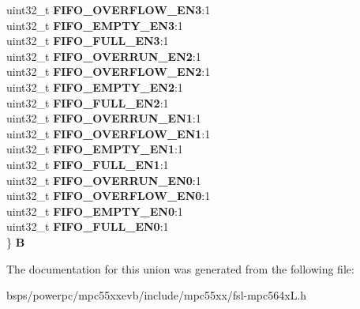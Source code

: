 \begin{DoxyCompactItemize}
\begin{tabbing}
\>uint32\_t {\bfseries FIFO\_OVERFLOW\_EN3}:1\\
\>uint32\_t {\bfseries FIFO\_EMPTY\_EN3}:1\\
\>uint32\_t {\bfseries FIFO\_FULL\_EN3}:1\\
\>uint32\_t {\bfseries FIFO\_OVERRUN\_EN2}:1\\
\>uint32\_t {\bfseries FIFO\_OVERFLOW\_EN2}:1\\
\>uint32\_t {\bfseries FIFO\_EMPTY\_EN2}:1\\
\>uint32\_t {\bfseries FIFO\_FULL\_EN2}:1\\
\>uint32\_t {\bfseries FIFO\_OVERRUN\_EN1}:1\\
\>uint32\_t {\bfseries FIFO\_OVERFLOW\_EN1}:1\\
\>uint32\_t {\bfseries FIFO\_EMPTY\_EN1}:1\\
\>uint32\_t {\bfseries FIFO\_FULL\_EN1}:1\\
\>uint32\_t {\bfseries FIFO\_OVERRUN\_EN0}:1\\
\>uint32\_t {\bfseries FIFO\_OVERFLOW\_EN0}:1\\
\>uint32\_t {\bfseries FIFO\_EMPTY\_EN0}:1\\
\>uint32\_t {\bfseries FIFO\_FULL\_EN0}:1\\
\} {\bfseries B}\\

\end{tabbing}\end{DoxyCompactItemize}


The documentation for this union was generated from the following file\+:\begin{DoxyCompactItemize}
\item 
bsps/powerpc/mpc55xxevb/include/mpc55xx/fsl-\/mpc564x\+L.\+h\end{DoxyCompactItemize}
